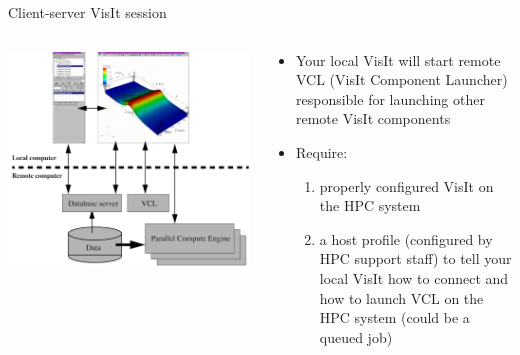 \begin{frame}{Client-server VisIt session}
  \vspace{-5mm}
  \begin{columns}
    \begin{column}{7.25cm}
      \includegraphics[width=\columnwidth]{figs/visit-guis/VisIt_arch}
    \end{column}
    \begin{column}{5.00cm}
      \begin{itemize}\setlength{\itemsep}{3mm}
      \item{\footnotesize Your local VisIt will start remote VCL (VisIt Component Launcher) responsible
        for launching other remote VisIt components}
      \item{\footnotesize Require:}
        \begin{enumerate}\setlength{\itemsep}{0mm}
        \item{\scriptsize properly configured VisIt on the HPC system}
        \item{\scriptsize a host profile (configured by HPC support staff) to tell your local VisIt
          how to connect and how to launch VCL on the HPC system (could be a queued job)}
        \end{enumerate}
      \end{itemize}
    \end{column}
  \end{columns}
\end{frame}


